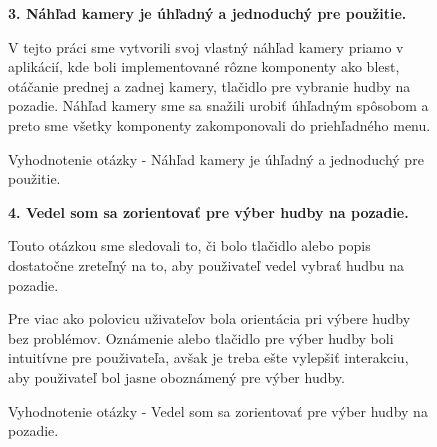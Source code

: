\begin{figure}[H]
 \textbf{3. Náhľad kamery je úhľadný a
jednoduchý pre použitie.}

V tejto práci sme vytvorili svoj vlastný náhľad kamery priamo v aplikácií, kde boli implementované rôzne komponenty ako blest, otáčanie prednej a zadnej kamery, tlačidlo pre vybranie hudby na pozadie. Náhľad kamery sme sa snažili urobiť úhľadným spôsobom a preto sme všetky komponenty zakomponovali do priehľadného menu.


\caption{Vyhodnotenie otázky - Náhľad kamery je úhľadný a
jednoduchý pre použitie.}
\end{figure}



\begin{figure}[H]
\textbf{4. Vedel som sa zorientovať pre
výber hudby na pozadie.}

Touto otázkou sme sledovali to, či bolo tlačidlo alebo popis dostatočne zreteľný na to, aby použivateľ vedel vybrať hudbu na pozadie.

Pre viac ako polovicu uživateľov bola orientácia pri výbere hudby bez problémov. Oznámenie alebo tlačidlo pre výber hudby boli intuitívne pre použivateľa, avšak je treba ešte vylepšiť interakciu, aby použivateľ bol jasne oboznámený pre výber hudby.

\caption{Vyhodnotenie otázky - Vedel som sa zorientovať pre
výber hudby na pozadie.}
\end{figure}


